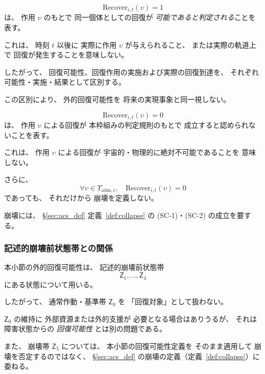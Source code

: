 \begin{remark}[$\mathrm{Recover}=1$ は実際の回復発生を意味しない]
\label{rem:recoverability_not_actual_recovery}
\[
  \mathrm{Recover}_{i,t}(\upsilon)=1
\]
は、
作用 $\upsilon$ のもとで
同一個体としての回復が
\emph{可能であると判定される}ことを表す。

これは、
時刻 $t$ 以後に
実際に作用 $\upsilon$ が与えられること、
または実際の軌道上で
回復が発生することを意味しない。

したがって、
回復可能性、回復作用の実施および実際の回復到達を、
それぞれ可能性・実施・結果として区別する。

この区別により、
外的回復可能性を
将来の実現事象と同一視しない。
\end{remark}

\begin{remark}[$\mathrm{Recover}=0$ の解釈]
\label{rem:recover_zero_scope}
\[
  \mathrm{Recover}_{i,t}(\upsilon)=0
\]
は、
作用 $\upsilon$ による回復が
本枠組みの判定規則のもとで
成立すると認められないことを表す。

これは、
作用 $\upsilon$ による回復が
宇宙的・物理的に絶対不可能であることを
意味しない。

さらに、
\[
  \forall\upsilon\in\Upsilon_{\mathrm{adm},i},
  \quad
  \mathrm{Recover}_{i,t}(\upsilon)=0
\]
であっても、
それだけから
崩壊を定義しない。

崩壊には、
\S\ref{sec:acs_def} 定義~\ref{def:collapse} の
(SC-1)・(SC-2) の成立を要する。
\end{remark}

\subsubsection{記述的崩壊前状態帯との関係}

\begin{remark}[外的回復可能性の対象範囲]
\label{rem:recover_predicate_scope}
本小節の外的回復可能性は、
記述的崩壊前状態帯
\[
  \mathsf{Z}_1,\ldots,\mathsf{Z}_4
\]
にある状態について用いる。

したがって、
通常作動・基準帯
$\mathsf{Z}_0$
を
「回復対象」として扱わない。

$\mathsf{Z}_0$ の維持に
外部資源または外的支援が
必要となる場合はありうるが、
それは
障害状態からの
\emph{回復可能性}
とは別の問題である。

また、
崩壊帯
$\mathsf{Z}_5$
については、
本小節の回復可能性定義を
そのまま適用して
崩壊を否定するのではなく、
\S\ref{sec:acs_def} の崩壊の定義（定義~\ref{def:collapse}）に委ねる。
\end{remark}

